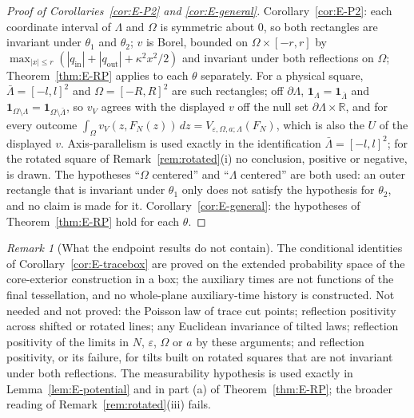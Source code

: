 \documentclass[11pt]{article}
\theoremstyle{plain}
\theoremstyle{definition}
\theoremstyle{remark}
\newtheorem{remark}[theorem]{Remark}
\newcommand{\R}{\mathbb{R}}
\newcommand{\ind}{\mathbf{1}}
\begin{document}
\begin{proof}[Proof of Corollaries~\ref{cor:E-P2} and \ref{cor:E-general}]
Corollary~\ref{cor:E-P2}: each coordinate interval of $\Lambda$ and $\Omega$ is symmetric
about $0$, so both rectangles are invariant under $\theta_1$ and $\theta_2$; $v$ is Borel,
bounded on $\Omega\times[-r,r]$ by $\max_{|x|\le r}(|q_{\mathrm{in}}|+|q_{\mathrm{out}}|+\kappa^{2}x^{2}/2)$ and invariant under both
reflections on $\Omega$; Theorem~\ref{thm:E-RP} applies to each $\theta$ separately. For a
physical square, $\bar\Lambda=[-l,l]^{2}$ and $\Omega=[-R,R]^{2}$ are such rectangles; off
$\partial\Lambda$, $\ind_\Lambda=\ind_{\bar\Lambda}$ and $\ind_{\Omega\setminus\Lambda}=\ind_{\Omega\setminus\bar\Lambda}$, so $v_V$ agrees with the displayed
$v$ off the null set $\partial\Lambda\times\R$, and for every outcome
$\int_\Omega v_V(z,F_N(z))\,dz=V_{\varepsilon,\Omega,a;\Lambda}(F_N)$, which is also the $U$ of the displayed $v$.
Axis-parallelism is used exactly in the identification $\bar\Lambda=[-l,l]^{2}$; for the
rotated square of Remark~\ref{rem:rotated}(i) no conclusion, positive or negative,
is drawn. The hypotheses ``$\Omega$ centered'' and ``$\Lambda$ centered'' are both used: an
outer rectangle that is invariant under $\theta_1$ only does not satisfy the
hypothesis for $\theta_2$, and no claim is made for it.
Corollary~\ref{cor:E-general}: the hypotheses of Theorem~\ref{thm:E-RP} hold for each
$\theta$.
\end{proof}

\begin{remark}[What the endpoint results do not contain]\label{rem:E-notcontained}
The conditional identities of Corollary~\ref{cor:E-tracebox} are proved on the extended
probability space of the core-exterior construction in a box; the auxiliary
times are not functions of the final tessellation, and no whole-plane
auxiliary-time history is constructed. Not needed and not proved: the Poisson law
of trace cut points; reflection positivity across shifted or rotated lines; any
Euclidean invariance of tilted laws; reflection positivity of the limits in $N$,
$\varepsilon$, $\Omega$ or $a$ by these arguments; and reflection positivity, or its failure, for
tilts built on rotated squares that are not invariant under both reflections.
The measurability hypothesis is used exactly in Lemma~\ref{lem:E-potential} and in
part (a) of Theorem~\ref{thm:E-RP}; the broader reading of Remark~\ref{rem:rotated}(iii)
fails.
\end{remark}

\end{document}
